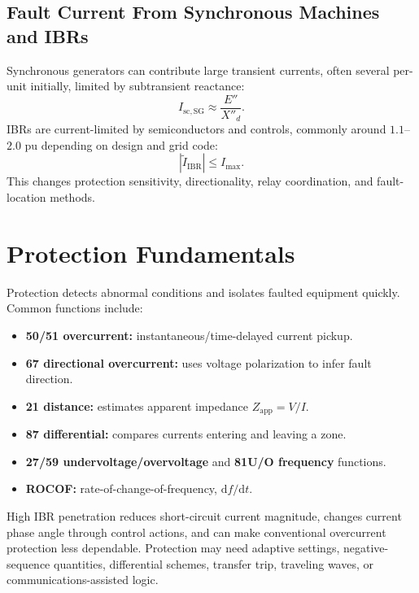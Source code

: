 \documentclass[11pt]{article}
\newcommand{\dd}{\mathrm{d}}
\begin{document}
\subsection{Fault Current From Synchronous Machines and IBRs}
Synchronous generators can contribute large transient currents, often several
per-unit initially, limited by subtransient reactance:
\begin{equation}
I_{\mathrm{sc,SG}}\approx \frac{E''}{X''_d}.
\end{equation}
IBRs are current-limited by semiconductors and controls, commonly around
$1.1$--$2.0$ pu depending on design and grid code:
\begin{equation}
|\tilde{I}_{\mathrm{IBR}}|\le I_{\max}.
\end{equation}
This changes protection sensitivity, directionality, relay coordination, and
fault-location methods.

\section{Protection Fundamentals}

Protection detects abnormal conditions and isolates faulted equipment quickly.
Common functions include:
\begin{itemize}
  \item \textbf{50/51 overcurrent:} instantaneous/time-delayed current pickup.
  \item \textbf{67 directional overcurrent:} uses voltage polarization to infer
  fault direction.
  \item \textbf{21 distance:} estimates apparent impedance $Z_{\mathrm{app}}=V/I$.
  \item \textbf{87 differential:} compares currents entering and leaving a zone.
  \item \textbf{27/59 undervoltage/overvoltage} and \textbf{81U/O frequency}
  functions.
  \item \textbf{ROCOF:} rate-of-change-of-frequency, $\dd f/\dd t$.
\end{itemize}

\begin{tcolorbox}[colback=yellow!6,colframe=yellow!45!black,title=IBR Protection Challenge]
High IBR penetration reduces short-circuit current magnitude, changes current
phase angle through control actions, and can make conventional overcurrent
protection less dependable. Protection may need adaptive settings, negative-
sequence quantities, differential schemes, transfer trip, traveling waves, or
communications-assisted logic.
\end{tcolorbox}
\end{document}
